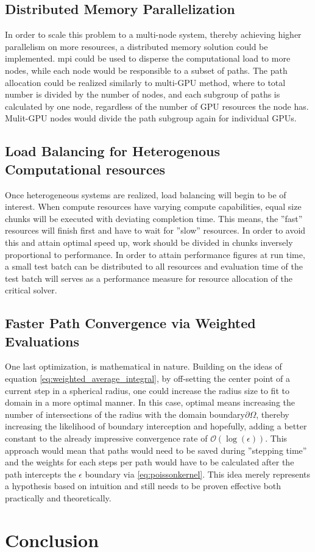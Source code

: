 \subsection{Distributed Memory Parallelization}

In order to scale this problem to a multi-node system, thereby achieving higher
parallelism on more resources, a distributed memory solution could be implemented.
\Gls{mpi} could be used to disperse the computational load to more nodes, while each
node would be responsible to a subset of paths.  The path allocation could be realized
similarly to multi-\gls{GPU} method, where to total number is divided by the number of nodes,
and each subgroup of paths is calculated by one node, regardless of the number of
\gls{GPU} resources the node has.  Mulit-GPU nodes would divide the path subgroup again
for individual \glspl{GPU}.

\subsection{Load Balancing for Heterogenous Computational resources}
Once heterogeneous systems are realized, load balancing will begin to be of interest.
When compute resources have varying compute capabilities, equal size chunks will
be executed with deviating completion time.  This means, the ''fast'' resources
will finish first and have to wait for ''slow'' resources.  In order to avoid this
and attain optimal speed up, work should be divided in chunks inversely proportional
to performance.  In order to attain performance figures at run time, a small test
batch can be distributed to all resources and evaluation time of the test batch will
serves as a performance measure for resource allocation of the critical solver.

\subsection{Faster Path Convergence via Weighted Evaluations}
One last optimization, is mathematical in nature.  Building on the ideas of
equation \ref{eq:weighted_average_integral}, by off-setting the center point of a current
step in a spherical radius, one could increase the radius size to fit to domain in a
more optimal manner.  In this case, optimal means increasing the number of intersections
of the radius with the domain boundary$\partial \Omega$, thereby increasing the likelihood of boundary
interception and hopefully, adding a better constant to the already impressive convergence
rate of $\mathcal{O}(\log(\epsilon))$.  This approach would mean that paths would need
to be saved during ''stepping time'' and the weights for
each steps per path would have to be calculated after the path intercepts the $\epsilon$
boundary via \ref{eq:poissonkernel}.  This idea merely represents a hypothesis
based on intuition and still needs to be proven effective both practically and theoretically.
\section{Conclusion}
